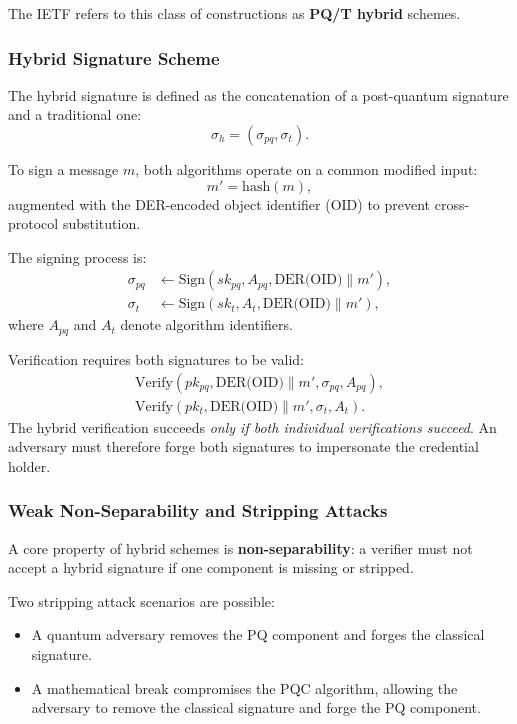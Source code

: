 \noindent
The IETF refers to this class of constructions as \textbf{PQ/T hybrid} schemes.

\subsubsection*{Hybrid Signature Scheme}
The hybrid signature is defined as the concatenation of a post-quantum signature and a traditional one:
\[
    \sigma_h = (\sigma_{pq}, \sigma_t).
\]

\noindent
To sign a message \( m \), both algorithms operate on a common modified input:
\[
    m' = \text{hash}(m),
\]
augmented with the DER-encoded object identifier (OID) to prevent cross-protocol substitution.  
\medskip

\noindent
The signing process is:
\[
\begin{aligned}
\sigma_{pq} &\leftarrow \text{Sign}(sk_{pq}, A_{pq}, \text{DER(OID)} \parallel m'), \\
\sigma_{t} &\leftarrow \text{Sign}(sk_{t}, A_{t}, \text{DER(OID)} \parallel m'),
\end{aligned}
\]
where \(A_{pq}\) and \(A_t\) denote algorithm identifiers.

\noindent
Verification requires both signatures to be valid:
\[
\begin{aligned}
\text{Verify}(pk_{pq}, \text{DER(OID)} \parallel m', \sigma_{pq}, A_{pq}), \\
\text{Verify}(pk_{t}, \text{DER(OID)} \parallel m', \sigma_{t}, A_{t}).
\end{aligned}
\]
The hybrid verification succeeds \emph{only if both individual verifications succeed}. An adversary must therefore forge both signatures to impersonate the credential holder.

\subsubsection*{Weak Non-Separability and Stripping Attacks}
A core property of hybrid schemes is \textbf{non-separability}: a verifier must not accept a hybrid signature if one component is missing or stripped.
\medskip

\noindent
Two stripping attack scenarios are possible:
\begin{itemize}
    \item A quantum adversary removes the PQ component and forges the classical signature.
    \item A mathematical break compromises the PQC algorithm, allowing the adversary to remove the classical signature and forge the PQ component.
\end{itemize}

